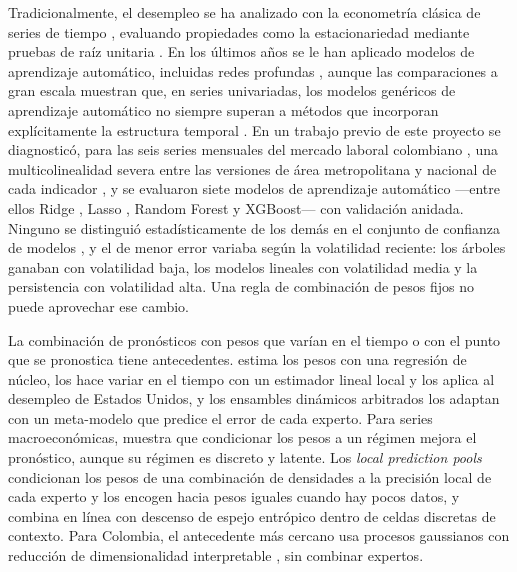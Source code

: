 \documentclass[11pt]{article}
\begin{document}
Tradicionalmente, el desempleo se ha analizado con la econometría clásica de series de tiempo \cite{boxjenkins1976}, evaluando propiedades como la estacionariedad mediante pruebas de raíz unitaria \cite{dickeyfuller1979}. En los últimos años se le han aplicado modelos de aprendizaje automático, incluidas redes profundas \cite{madaras2024}, aunque las comparaciones a gran escala muestran que, en series univariadas, los modelos genéricos de aprendizaje automático no siempre superan a métodos que incorporan explícitamente la estructura temporal \cite{makridakis2018,makridakis2020}. En un trabajo previo de este proyecto se diagnosticó, para las seis series mensuales del mercado laboral colombiano \cite{banrep_sf_mercado}, una multicolinealidad severa entre las versiones de área metropolitana y nacional de cada indicador \cite{hair2019}, y se evaluaron siete modelos de aprendizaje automático ---entre ellos Ridge \cite{hoerl1970}, Lasso \cite{tibshirani1996}, Random Forest y XGBoost--- con validación anidada. Ninguno se distinguió estadísticamente de los demás en el conjunto de confianza de modelos \cite{hansen2011}, y el de menor error variaba según la volatilidad reciente: los árboles ganaban con volatilidad baja, los modelos lineales con volatilidad media y la persistencia con volatilidad alta. Una regla de combinación de pesos fijos \cite{timmermann2006} no puede aprovechar ese cambio.

La combinación de pronósticos con pesos que varían en el tiempo o con el punto que se pronostica tiene antecedentes. \cite{li2001} estima los pesos con una regresión de núcleo, \cite{chenmaung2023} los hace variar en el tiempo con un estimador lineal local y los aplica al desempleo de Estados Unidos, y los ensambles dinámicos arbitrados \cite{cerqueira2017} los adaptan con un meta-modelo que predice el error de cada experto. Para series macroeconómicas, \cite{elliotttimmermann2005} muestra que condicionar los pesos a un régimen mejora el pronóstico, aunque su régimen es discreto y latente. Los \textit{local prediction pools} \cite{oelrich2024} condicionan los pesos de una combinación de densidades a la precisión local de cada experto y los encogen hacia pesos iguales cuando hay pocos datos, y \cite{dang2027} combina en línea con descenso de espejo entrópico dentro de celdas discretas de contexto. Para Colombia, el antecedente más cercano usa procesos gaussianos con reducción de dimensionalidad interpretable \cite{perezrosero2025}, sin combinar expertos.
\end{document}
